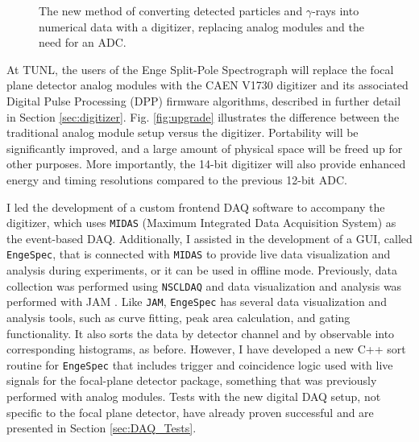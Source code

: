 \begin{figure}[t]
\begin{tikzpicture}[scale=1.25, every node/.style={transform shape}]
\end{tikzpicture}
\caption{\label{fig:new_electronics}The new method of converting detected particles and $\gamma$-rays into numerical data with a digitizer, replacing analog modules and the need for an ADC.}
\end{figure}

At TUNL, the users of the Enge Split-Pole Spectrograph will replace the focal plane detector analog modules with the CAEN V1730 digitizer and its associated Digital Pulse Processing (DPP) firmware algorithms, described in further detail in Section \ref{sec:digitizer}. Fig. \ref{fig:upgrade} illustrates the difference between the traditional analog module setup versus the digitizer. Portability will be significantly improved, and a large amount of physical space will be freed up for other purposes. More importantly, the 14-bit digitizer will also provide enhanced energy and timing resolutions compared to the previous 12-bit ADC.

I led the development of a custom frontend DAQ software to accompany the digitizer, which uses \texttt{MIDAS} (Maximum Integrated Data Acquisition System) \cite{MIDAS} as the event-based DAQ. Additionally, I assisted in the development of a GUI, called \texttt{EngeSpec}, that is connected with \texttt{MIDAS} to provide live data visualization and analysis during experiments, or it can be used in offline mode.
Previously, data collection was performed using \texttt{NSCLDAQ} \cite{NSCLDAQ} and data visualization and analysis was performed with JAM \cite{Swartz2001,Jam}. Like \texttt{JAM}, \texttt{EngeSpec} has several data visualization and analysis tools, such as curve fitting, peak area calculation, and gating functionality. It also sorts the data by detector channel and by observable into corresponding histograms, as before. However, I have developed a new C++ sort routine for \texttt{EngeSpec} that includes trigger and coincidence logic used with live signals for the focal-plane detector package, something that was previously performed with analog modules. Tests with the new digital DAQ setup, not specific to the focal plane detector, have already proven successful and are presented in Section \ref{sec:DAQ_Tests}.



